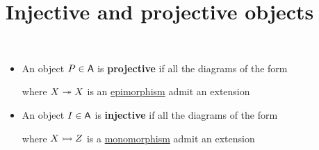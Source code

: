 \documentclass[../../../main]{subfiles}
\begin{document}
\section{Injective and projective objects}

\begin{definition} \label{def:injective-projective-objects}~
  \begin{itemize}
    \item An object \(P \in \mathsf{A}\) is \textbf{projective} if all the diagrams of the form
          \begin{center}
          \end{center}
          where \(X \twoheadrightarrow X\) is an \hyperref[def:mono-epi-morphism]{epimorphism} admit an extension
           \begin{center}
          \end{center}

    \item An object \(I \in \mathsf{A}\) is \textbf{injective} if all the diagrams of the form
          \begin{center}
          \end{center}
          where \(X \rightarrowtail Z\) is a \hyperref[def:mono-epi-morphism]{monomorphism} admit an extension
           \begin{center}
          \end{center}
  \end{itemize}
\end{definition}
\end{document}
